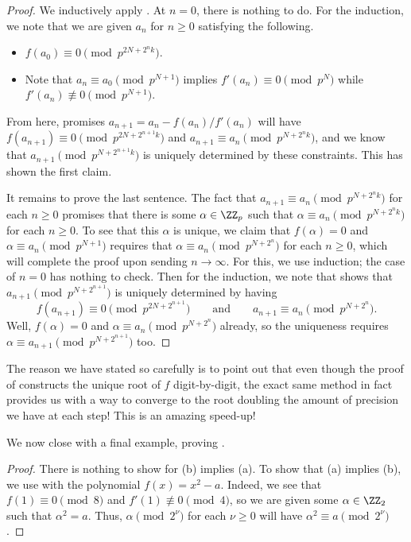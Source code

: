\documentclass[../notes.tex]{subfiles}
\begin{document}
\begin{proof}
	We inductively apply . At $n=0$, there is nothing to do. For the induction, we note that we are given $a_n$ for $n\ge0$ satisfying the following.
	\begin{itemize}
		\item $f(a_0)\equiv0\pmod{p^{2N+2^nk}}$.
		\item Note that $a_n\equiv a_0\pmod{p^{N+1}}$ implies $f'(a_n)\equiv0\pmod{p^N}$ while $f'(a_n)\not\equiv0\pmod{p^{N+1}}$.
	\end{itemize}
	From here,  promises $a_{n+1}=a_n-f(a_n)/f'(a_n)$ will have $f(a_{n+1})\equiv0\pmod{p^{2N+2^{n+1}k}}$ and $a_{n+1}\equiv a_n\pmod{p^{N+2^nk}}$, and we know that $a_{n+1}\pmod{p^{N+2^{n+1}k}}$ is uniquely determined by these constraints. This has shown the first claim.

	It remains to prove the last sentence. The fact that $a_{n+1}\equiv a_n\pmod{p^{N+2^nk}}$ for each $n\ge0$ promises that there is some $\alpha\in\ZZ_p$ such that $\alpha\equiv a_n\pmod{p^{N+2^nk}}$ for each $n\ge0$. To see that this $\alpha$ is unique, we claim that $f(\alpha)=0$ and $\alpha\equiv a_n\pmod{p^{N+1}}$ requires that $\alpha\equiv a_n\pmod{p^{N+2^n}}$ for each $n\ge0$, which will complete the proof upon sending $n\to\infty$. For this, we use induction; the case of $n=0$ has nothing to check. Then for the induction, we note that  shows that $a_{n+1}\pmod{p^{N+2^{n+1}}}$ is uniquely determined by having
	\[f(a_{n+1})\equiv0\pmod{p^{2N+2^{n+1}}}\qquad\text{and}\qquad a_{n+1}\equiv a_n\pmod{p^{N+2^n}}.\]
	Well, $f(\alpha)=0$ and $\alpha\equiv a_n\pmod{p^{N+2^n}}$ already, so the uniqueness requires $\alpha\equiv a_{n+1}\pmod{p^{N+2^{n+1}}}$ too.
\end{proof}
\begin{remark}
	The reason we have stated  so carefully is to point out that even though the proof of  constructs the unique root of $f$ digit-by-digit, the exact same method in fact provides us with a way to converge to the root doubling the amount of precision we have at each step! This is an amazing speed-up!
\end{remark}
We now close with a final example, proving .
\ztwosquares*
\begin{proof}
	There is nothing to show for (b) implies (a). To show that (a) implies (b), we use  with the polynomial $f(x)=x^2-a$. Indeed, we see that $f(1)\equiv0\pmod8$ and $f'(1)\not\equiv0\pmod4$, so we are given some $\alpha\in\ZZ_2$ such that $\alpha^2=a$. Thus, $\alpha\pmod{2^\nu}$ for each $\nu\ge0$ will have $\alpha^2\equiv a\pmod{2^\nu}$.
\end{proof}
\end{document}
